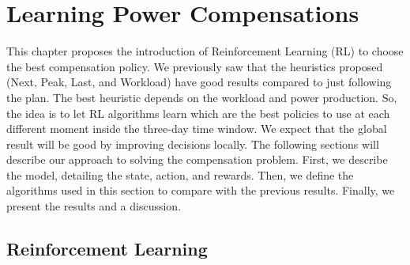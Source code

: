 \chapter{Learning Power Compensations}
\label{cha:learning_power_compensations}

\minitoc

This chapter proposes the introduction of Reinforcement Learning (RL) to choose the best compensation policy. We previously saw that the heuristics proposed (Next, Peak, Last, and Workload) have good results compared to just following the plan. The best heuristic depends on the workload and power production. So, the idea is to let RL algorithms learn which are the best policies to use at each different moment inside the three-day time window. We expect that the global result will be good by improving decisions locally. The following sections will describe our approach to solving the compensation problem. First, we describe the model, detailing the state, action, and rewards. Then, we define the algorithms used in this section to compare with the previous results. Finally, we present the results and a discussion.

\section{Reinforcement Learning}

